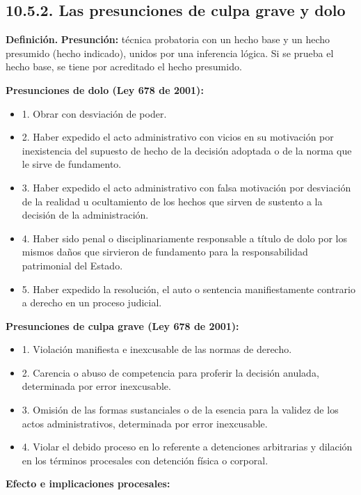 \subsection{10.5.2. Las presunciones de culpa grave y dolo}
\begin{definicion}
\textcolor[HTML]{1F3864}{\textbf{Definición. }}\textbf{Presunción: }técnica probatoria con un hecho base y un hecho presumido (hecho indicado), unidos por una inferencia lógica. Si se prueba el hecho base, se tiene por acreditado el hecho presumido.
\end{definicion}
\textbf{Presunciones de dolo (Ley 678 de 2001):}

\begin{itemize}
\item 1. Obrar con desviación de poder.
\item 2. Haber expedido el acto administrativo con vicios en su motivación por inexistencia del supuesto de hecho de la decisión adoptada o de la norma que le sirve de fundamento.
\item 3. Haber expedido el acto administrativo con falsa motivación por desviación de la realidad u ocultamiento de los hechos que sirven de sustento a la decisión de la administración.
\item 4. Haber sido penal o disciplinariamente responsable a título de dolo por los mismos daños que sirvieron de fundamento para la responsabilidad patrimonial del Estado.
\item 5. Haber expedido la resolución, el auto o sentencia manifiestamente contrario a derecho en un proceso judicial.
\end{itemize}
\textbf{Presunciones de culpa grave (Ley 678 de 2001):}

\begin{itemize}
\item 1. Violación manifiesta e inexcusable de las normas de derecho.
\item 2. Carencia o abuso de competencia para proferir la decisión anulada, determinada por error inexcusable.
\item 3. Omisión de las formas sustanciales o de la esencia para la validez de los actos administrativos, determinada por error inexcusable.
\item 4. Violar el debido proceso en lo referente a detenciones arbitrarias y dilación en los términos procesales con detención física o corporal.
\end{itemize}
\textbf{Efecto e implicaciones procesales:}

